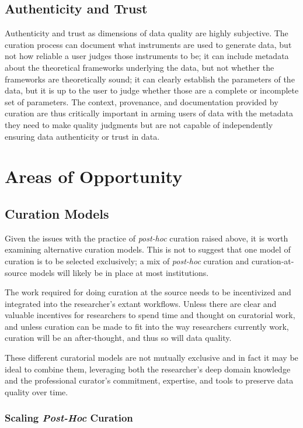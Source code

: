 \documentclass{acm_proc_article-sp}
\begin{document}
\subsection{Authenticity and Trust}

Authenticity and trust as dimensions of data quality are highly
subjective.  The curation process can document what instruments are
used to generate data, but not how reliable a user judges those
instruments to be; it can include metadata about the theoretical
frameworks underlying the data, but not whether the frameworks are
theoretically sound; it can clearly establish the parameters of the
data, but it is up to the user to judge whether those are a complete
or incomplete set of parameters. The context, provenance, and
documentation provided by curation are thus critically important in
arming users of data with the metadata they need to make quality
judgments but are not capable of independently ensuring data
authenticity or trust in data.

\section{Areas of Opportunity}

\subsection{Curation Models}
Given the issues with the practice of \textit{post-hoc} curation
raised above, it is worth examining alternative curation models. This
is not to suggest that one model of curation is to be selected
exclusively; a mix of \textit{post-hoc} curation and
curation-at-source models will likely be in place at most
institutions.

The work required for doing curation at the source needs to be
incentivized and integrated into the researcher's extant
workflows. Unless there are clear and valuable incentives for
researchers to spend time and thought on curatorial work, and unless
curation can be made to fit into the way researchers currently work,
curation will be an after-thought, and thus so will data quality.

These different curatorial models are not mutually exclusive and in
fact it may be ideal to combine them, leveraging both the researcher's
deep domain knowledge and the professional curator's commitment,
expertise, and tools to preserve data quality over time.

\subsubsection{Scaling \textit{Post-Hoc} Curation}
\end{document}
